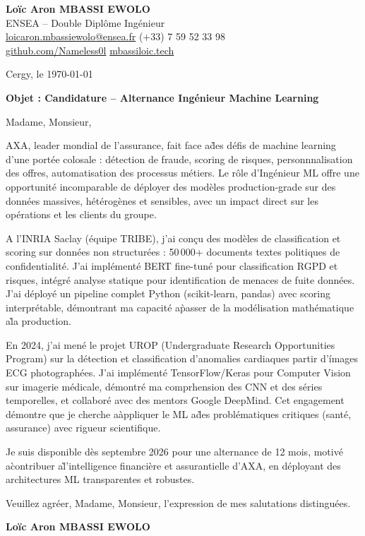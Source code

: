 \documentclass[a4paper,11pt]{article}
\begin{document}
\noindent
\textbf{Lo\"ic Aron MBASSI EWOLO} \\
ENSEA -- Double Dipl\^ome Ing\'enieur \\
\href{mailto:loicaron.mbassiewolo@ensea.fr}{loicaron.mbassiewolo@ensea.fr} \quad (+33) 7 59 52 33 98 \\
\href{https://github.com/Nameless0l}{github.com/Nameless0l} \quad \href{https://mbassiloic.tech}{mbassiloic.tech}

\vspace{1em}
\noindent Cergy, le \today

\vspace{1em}
\noindent \textbf{Objet : Candidature -- Alternance Ing\'enieur Machine Learning}

\vspace{1.5em}
\noindent Madame, Monsieur,

\vspace{0.8em}
\noindent AXA, leader mondial de l'assurance, fait face a\` des d\'efis de machine learning d'une port\'ee colosale : d\'etection de fraude, scoring de risques, personnnalisation des offres, automatisation des processus m\'etiers. Le r\^ole d'Ing\'enieur ML offre une opportunit\'e incomparable de d\'eployer des mod\`eles production-grade sur des donn\'ees massives, h\'et\'erog\`enes et sensibles, avec un impact direct sur les op\'erations et les clients du groupe.

\vspace{0.8em}
\noindent A l'INRIA Saclay (\'equipe TRIBE), j'ai con\c{c}u des mod\`eles de classification et scoring sur donn\'ees non structur\'ees : 50\,000+ documents textes politiques de confidentialit\'e. J'ai impl\'ement\'e BERT fine-tun\'e pour classification RGPD et risques, int\'egr\'e analyse statique pour identification de menaces de fuite donn\'ees. J'ai d\'eploy\'e un pipeline complet Python (scikit-learn, pandas) avec scoring interpr\'etable, d\'emontrant ma capacit\'e a\` passer de la mod\'elisation math\'ematique a\` la production.

\vspace{0.8em}
\noindent En 2024, j'ai men\'e le projet UROP (Undergraduate Research Opportunities Program) sur la d\'etection et classification d'anomalies cardiaques partir d'\'images ECG photograph\'ees. J'ai impl\'ement\'e TensorFlow/Keras pour Computer Vision sur imagerie m\'edicale, d\'emontr\'e ma comprhension des CNN et des s\'eries temporelles, et collabor\'e avec des mentors Google DeepMind. Cet engagement d\'emontre que je cherche a\` appliquer le ML a\` des probl\'ematiques critiques (sant\'e, assurance) avec rigueur scientifique.

\vspace{0.8em}
\noindent Je suis disponible d\`es septembre 2026 pour une alternance de 12 mois, motiv\'e a\` contribuer a\` l'intelligence financi\`ere et assurantielle d'AXA, en d\'eployant des architectures ML transparentes et robustes.

\vspace{1.5em}
\noindent Veuillez agr\'eer, Madame, Monsieur, l'expression de mes salutations distingu\'ees.

\vspace{2em}
\noindent \textbf{Lo\"ic Aron MBASSI EWOLO}
\end{document}
